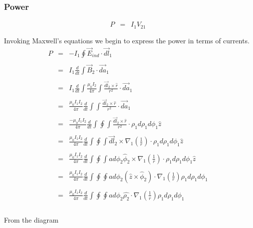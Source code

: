 \documentclass[12pt]{revtex4}
\begin{document}
\subsubsection{Power}

\begin{eqnarray*}
P&=&I_{1}V_{21}\\ \\
\end{eqnarray*}
Invoking Maxwell's equations we begin to express the power in terms of currents. 
\begin{eqnarray*}
P&=&-I_{1} \oint \vec{E}_{ind} \cdot \vec{dl}_{1} \\ \\
&=&I_{1} \frac{d}{dt}\int \vec{B}_{2} \cdot \vec{da}_{1} \\ \\
&=&I_{1} \frac{d}{dt}\int \frac{\mu_{0}I_{2}}{4\pi} \int \frac{\vec{dl}_{2} \times \hat{r}}{r^{2}} \cdot \vec{da}_{1} \\ \\
&=&\frac{\mu_{0}I_{1}I_{2}}{4\pi} \frac{d}{dt}\int \int \frac{\vec{dl}_{2} \times \hat{r}}{r^{2}} \cdot \vec{da}_{1} \\ \\
&=&\frac{-\mu_{0}I_{1}I_{2}}{4\pi} \frac{d}{dt}\int  \oint  \int \frac{\vec{dl}_{2} \times \hat{r}}{r^{2}} \cdot \rho_{1} d\rho_{1} d\phi_{1} \hat{z}\\ \\
&=&\frac{\mu_{0}I_{1}I_{2}}{4\pi} \frac{d}{dt}\int  \oint \int \vec{dl}_{2} \times \nabla_1( \frac{1}{r}) \cdot \rho_{1} d\rho_{1} d\phi_{1} \hat{z}\\ \\
&=&\frac{\mu_{0}I_{1}I_{2}}{4\pi} \frac{d}{dt}\int  \oint \int a d\phi_{2} \hat{\phi}_{2} \times \nabla_1( \frac{1}{r}) \cdot \rho_{1} d\rho_{1} d\phi_{1} \hat{z}\\ \\
&=&\frac{\mu_{0}I_{1}I_{2}}{4\pi} \frac{d}{dt}\int  \oint \oint a d\phi_{2}(\hat{z}\times \hat{\phi}_{2} ) \cdot \nabla_1( \frac{1}{r})  \rho_{1} d\rho_{1} d\phi_{1} \\ \\
&=&\frac{\mu_{0}I_{1}I_{2}}{4\pi} \frac{d}{dt}\int  \oint \oint a d\phi_{2} \hat{\rho_{2}} \cdot \nabla_{1}( \frac{1}{r})  \rho_{1} d\rho_{1} d\phi_{1} \\ \\
\end{eqnarray*}

From the diagram
\end{document}
